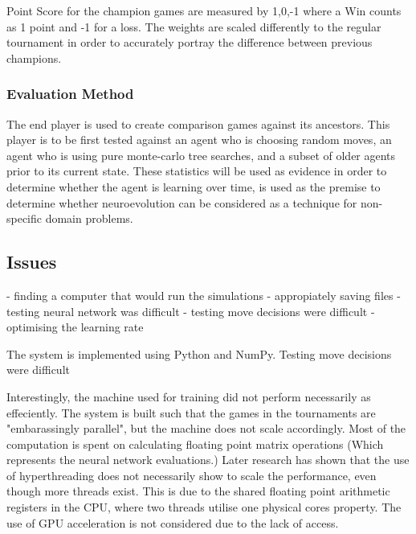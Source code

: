 \documentclass[12pt,a4paper]{article}
\begin{document}
        Point Score for the champion games are measured by {1,0,-1} where a Win counts as 1 point and -1 for a loss. The weights are scaled differently to the regular tournament in order to accurately portray the difference between previous champions.
    
        \subsubsection*{Evaluation Method}
    
        The end player is used to create comparison games against its ancestors. This player is to be first tested against an agent who is choosing random moves, an agent who is using pure monte-carlo tree searches, and a subset of older agents prior to its current state. These statistics will be used as evidence in order to determine whether the agent is learning over time, is used as the premise to determine whether neuroevolution can be considered as a technique for non-specific domain problems.
       
    \subsection{Issues}
       
        - finding a computer that would run the simulations
        - appropiately saving files
        - testing neural network was difficult
        - testing move decisions were difficult
        - optimising the learning rate

    The system is implemented using Python and NumPy.
    Testing move decisions were difficult
    

    Interestingly, the machine used for training did not perform necessarily as effeciently. The system is built such that the games in the tournaments are "embarassingly parallel", but the machine does not scale accordingly. Most of the computation is spent on calculating floating point matrix operations (Which represents the neural network evaluations.) 
    Later research has shown that the use of hyperthreading does not necessarily show to scale the performance, even though more threads exist. \cite{leng_empirical_2002} This is due to the shared floating point arithmetic registers in the CPU, where two threads utilise one physical cores property. 
    The use of GPU acceleration is not considered due to the lack of access. 
    
\end{document}
